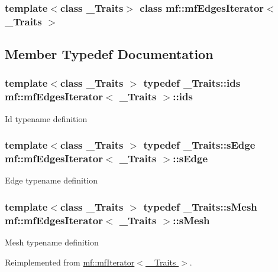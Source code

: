 \subsubsection*{template$<$class \_\-Traits$>$ class mf::mfEdgesIterator$<$ \_\-Traits $>$}



\subsection{Member Typedef Documentation}
\hypertarget{classmf_1_1mfEdgesIterator_a6950c402f825ad11316256f59e5ae887}{
\subsubsection[{ids}]{\setlength{\rightskip}{0pt plus 5cm}template$<$class \_\-Traits $>$ typedef \_\-Traits::ids {\bf mf::mfEdgesIterator}$<$ \_\-Traits $>$::{\bf ids}}}
\label{classmf_1_1mfEdgesIterator_a6950c402f825ad11316256f59e5ae887}
Id typename definition \hypertarget{classmf_1_1mfEdgesIterator_afeb149d8a3c0efac598f1c13daf711b1}{
\subsubsection[{sEdge}]{\setlength{\rightskip}{0pt plus 5cm}template$<$class \_\-Traits $>$ typedef \_\-Traits::sEdge {\bf mf::mfEdgesIterator}$<$ \_\-Traits $>$::{\bf sEdge}}}
\label{classmf_1_1mfEdgesIterator_afeb149d8a3c0efac598f1c13daf711b1}
Edge typename definition \hypertarget{classmf_1_1mfEdgesIterator_aef5fcd1a83c753089ba7c4e3d6f33733}{
\subsubsection[{sMesh}]{\setlength{\rightskip}{0pt plus 5cm}template$<$class \_\-Traits $>$ typedef \_\-Traits::sMesh {\bf mf::mfEdgesIterator}$<$ \_\-Traits $>$::{\bf sMesh}}}
\label{classmf_1_1mfEdgesIterator_aef5fcd1a83c753089ba7c4e3d6f33733}
Mesh typename definition 

Reimplemented from \hyperlink{classmf_1_1mfIterator_aca31e4d7e7eca4e3b100530d8725064b}{mf::mfIterator$<$ \_\-Traits $>$}.



